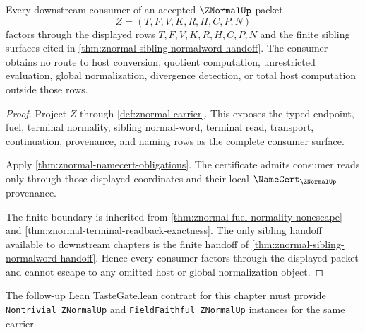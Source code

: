 \begin{theorem}
\label{thm:znormal-consumer-nonescape}
Every downstream consumer of an accepted $\ZNormalUp$ packet
$$
Z=(T,F,V,K,R,H,C,P,N)
$$
factors through the displayed rows $T,F,V,K,R,H,C,P,N$ and the finite sibling surfaces cited in \autoref{thm:znormal-sibling-normalword-handoff}. The consumer obtains no route to host conversion, quotient computation, unrestricted evaluation, global normalization, divergence detection, or total host computation outside those rows.
\end{theorem}
\begin{proof}
Project $Z$ through \autoref{def:znormal-carrier}. This exposes the typed endpoint, fuel, terminal normality, sibling normal-word, terminal read, transport, continuation, provenance, and naming rows as the complete consumer surface.

Apply \autoref{thm:znormal-namecert-obligations}. The certificate admits consumer reads only through those displayed coordinates and their local $\NameCert_{\ZNormalUp}$ provenance.

The finite boundary is inherited from \autoref{thm:znormal-fuel-normality-nonescape} and \autoref{thm:znormal-terminal-readback-exactness}. The only sibling handoff available to downstream chapters is the finite handoff of \autoref{thm:znormal-sibling-normalword-handoff}. Hence every consumer factors through the displayed packet and cannot escape to any omitted host or global normalization object.
\end{proof}

The follow-up Lean TasteGate.lean contract for this chapter must provide \texttt{Nontrivial ZNormalUp} and \texttt{FieldFaithful ZNormalUp} instances for the same carrier.

